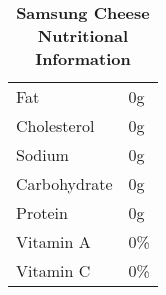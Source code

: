 \begin{table}[htbp]
\centering
\caption{\textbf{Samsung Cheese Nutritional Information}}
\begin{tabular}{|ll|}
\hline
Fat          & 0g  \\
Cholesterol  & 0g  \\
Sodium       & 0g  \\
Carbohydrate & 0g  \\
Protein      & 0g  \\ \hline
Vitamin A    & 0\% \\
Vitamin C    & 0\% \\ \hline
\end{tabular}
\label{tab:nutricheese}
\end{table}
